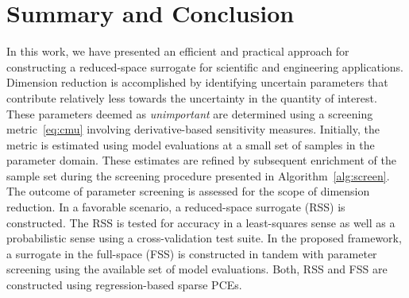 \section{Summary and Conclusion}
\label{sec:disc}


In this work, we have presented an efficient and practical approach for constructing
a reduced-space
surrogate for scientific and engineering applications. Dimension reduction is accomplished
by identifying uncertain parameters that contribute relatively less towards the uncertainty
in the quantity of interest. These parameters deemed as \textit{unimportant} are determined
using a screening metric~\eqref{eq:cmu} involving derivative-based sensitivity
measures. Initially, the metric is estimated
using model evaluations at a small set of samples in the parameter domain. These
estimates are refined by subsequent enrichment of the sample set during the screening
procedure presented in Algorithm~\ref{alg:screen}. The outcome of parameter screening is
assessed for the scope of dimension reduction. In a favorable scenario, a reduced-space
surrogate (RSS) is constructed. The RSS is tested for accuracy in a least-squares sense
as well as a probabilistic sense using a cross-validation test suite. In the proposed framework,
a surrogate in the full-space (FSS) is constructed in tandem with parameter screening using
the available set of model evaluations. Both, RSS and FSS are
constructed using regression-based sparse PCEs. 

